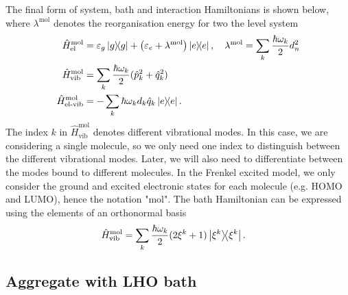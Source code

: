 The final form of system, bath and interaction Hamiltonians is shown below, where $\lambda^\text{mol}$ denotes the reorganisation energy for two the level system
\begin{equation}
\label{Hamiltonian_mol}
    \begin{aligned}
    \hat{H}^\text{mol}_\text{el} &= \varepsilon_g \ketbra{g} + \left(\varepsilon_e + \lambda^\text{mol}\right)\ketbra{e}, \quad \lambda^\text{mol} = \sum_k \frac{\hbar\omega_k}{2} d_n^2 \\
    \hat{H}^\text{mol}_\text{vib} &= \sum_k \frac{\hbar \omega_k}{2}(\hat{p}^2_k + \hat{q}^2_k) \\
    \hat{H}^\text{mol}_\text{el-vib} &= -\sum_k \hbar\omega_k d_k\hat{q}_k\ketbra{e}.
    \end{aligned}
\end{equation}
The index $k$ in $\hat{H}^\text{mol}_\text{vib}$ denotes different vibrational modes. In this case, we are considering a single molecule, so we only need one index to distinguish between the different vibrational modes. Later, we will also need to differentiate between the modes bound to different molecules. In the Frenkel excited model, we only consider the ground and excited electronic states for each molecule (e.g. HOMO and LUMO), hence the notation "mol". The bath Hamiltonian can be expressed using the elements of an orthonormal basis
\begin{equation}
    \begin{aligned}
    \hat{H}^\text{mol}_\text{vib} &= \sum_{k} \frac{\hbar \omega_{k}}{2} (2\xi^{k} + 1)\ketbra{\xi^{k}}.
    \end{aligned}
\end{equation}

\subsection{Aggregate with LHO bath}
\label{Aggregate with LHO bath}

